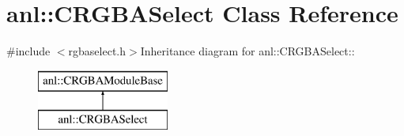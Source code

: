 \hypertarget{classanl_1_1CRGBASelect}{
\section{anl::CRGBASelect Class Reference}
\label{classanl_1_1CRGBASelect}
}


{\ttfamily \#include $<$rgbaselect.h$>$}Inheritance diagram for anl::CRGBASelect::\begin{figure}[H]
\begin{center}
\leavevmode
\includegraphics[height=2cm]{classanl_1_1CRGBASelect}
\end{center}
\end{figure}
